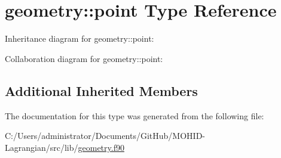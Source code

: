 \hypertarget{structgeometry_1_1point}{}\section{geometry\+:\+:point Type Reference}
\label{structgeometry_1_1point}


Inheritance diagram for geometry\+:\+:point\+:


Collaboration diagram for geometry\+:\+:point\+:
\subsection*{Additional Inherited Members}


The documentation for this type was generated from the following file\+:\begin{DoxyCompactItemize}
\item 
C\+:/\+Users/administrator/\+Documents/\+Git\+Hub/\+M\+O\+H\+I\+D-\/\+Lagrangian/src/lib/\mbox{\hyperlink{geometry_8f90}{geometry.\+f90}}\end{DoxyCompactItemize}
